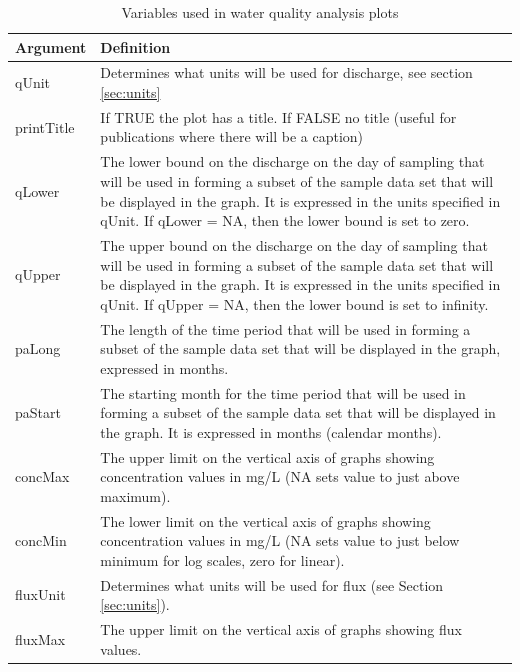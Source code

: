 \documentclass[a4paper,11pt]{article}\usepackage{graphicx, color}
\begin{document}
\begin{table}[ht]
\caption{Variables used in water quality analysis plots  \label{tab:wqVariables}}
\begin{tabularx}{\textwidth}{lX}
\hline
  \textbf{Argument} & \textbf{Definition} \\
\hline
qUnit & Determines what units will be used for discharge, see section \ref{sec:units}\\
printTitle & If TRUE the plot has a title.  If FALSE no title (useful for publications where there will be a caption)\\
qLower & The lower bound on the discharge on the day of sampling that will be used in forming a subset of the sample data set that will be displayed in the graph.  It is expressed in the units specified in qUnit.  If qLower = NA, then the lower bound is set to zero.\\
qUpper & The upper bound on the discharge on the day of sampling that will be used in forming a subset of the sample data set that will be displayed in the graph.  It is expressed in the units specified in qUnit.  If qUpper = NA, then the lower bound is set to infinity.\\
paLong & The length of the time period that will be used in forming a subset of the sample data set that will be displayed in the graph, expressed in months. \\ 
paStart & The starting month for the time period that will be used in forming a subset of the sample data set that will be displayed in the graph.  It is expressed in months (calendar months).\\
concMax & The upper limit on the vertical axis of graphs showing concentration values in mg/L (NA sets value to just above maximum).  \\
concMin & The lower limit on the vertical axis of graphs showing concentration values in mg/L (NA sets value to just below minimum for log scales, zero for linear).  \\
fluxUnit & Determines what units will be used for flux (see Section \ref{sec:units}).\\
fluxMax & The upper limit on the vertical axis of graphs showing flux values.  \\
\hline
\end{tabularx}

\end{table}

\FloatBarrier
\clearpage


\end{document}
